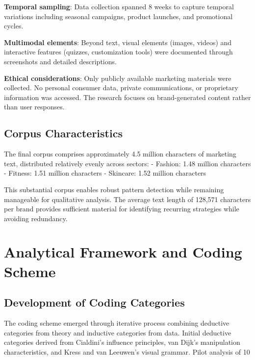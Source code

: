\textbf{Temporal sampling}: Data collection spanned 8 weeks to capture temporal variations including seasonal campaigns, product launches, and promotional cycles.

\textbf{Multimodal elements}: Beyond text, visual elements (images, videos) and interactive features (quizzes, customization tools) were documented through screenshots and detailed descriptions.

\textbf{Ethical considerations}: Only publicly available marketing materials were collected. No personal consumer data, private communications, or proprietary information was accessed. The research focuses on brand-generated content rather than user responses.

\subsection{Corpus Characteristics}

The final corpus comprises approximately 4.5 million characters of marketing text, distributed relatively evenly across sectors:
- Fashion: 1.48 million characters
- Fitness: 1.51 million characters  
- Skincare: 1.52 million characters

This substantial corpus enables robust pattern detection while remaining manageable for qualitative analysis. The average text length of 128,571 characters per brand provides sufficient material for identifying recurring strategies while avoiding redundancy.

\section{Analytical Framework and Coding Scheme}
\label{sec:analytical_framework}

\subsection{Development of Coding Categories}

The coding scheme emerged through iterative process combining deductive categories from theory and inductive categories from data. Initial deductive categories derived from Cialdini's influence principles, van Dijk's manipulation characteristics, and Kress and van Leeuwen's visual grammar. Pilot analysis of 10\\%

